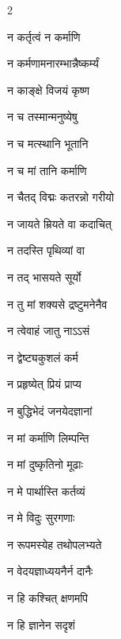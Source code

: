 \begin{multicols}{2}
\begin{indexlist}
\item न कर्तृत्वं न कर्माणि \dotfill {}
\item न कर्मणामनारम्भान्नैष्कर्म्यं \dotfill {}
\item न काङ्क्षे विजयं कृष्ण \dotfill {}
\item न च तस्मान्मनुष्येषु \dotfill {}
\item न च मत्स्थानि भूतानि \dotfill {}
\item न च मां तानि कर्माणि \dotfill {}
\item न चैतद् विद्मः कतरन्नो गरीयो \dotfill {}
\item न जायते म्रियते वा कदाचित् \dotfill {}
\item न तदस्ति पृथिव्यां वा \dotfill {}
\item न तद् भासयते सूर्यो \dotfill {}
\item न तु मां शक्यसे द्रष्टुमनेनैव \dotfill {}
\item न त्वेवाहं जातु नाऽऽसं \dotfill {}
\item न द्वेष्ट्यकुशलं कर्म \dotfill {}
\item न प्रहृष्येत् प्रियं प्राप्य \dotfill {}
\item न बुद्धिभेदं जनयेदज्ञानां \dotfill {}
\item न मां कर्माणि लिम्पन्ति \dotfill {}
\item न मां दुष्कृतिनो मूढाः \dotfill {}
\item न मे पार्थास्ति कर्तव्यं \dotfill {}
\item न मे विदुः सुरगणाः \dotfill {}
\item न रूपमस्येह तथोपलभ्यते \dotfill {}
\item न वेदयज्ञाध्ययनैर्न दानैः \dotfill {}
\item न हि कश्चित् क्षणमपि \dotfill {}
\item न हि ज्ञानेन सदृशं \dotfill {}

\end{indexlist}
\end{multicols}
